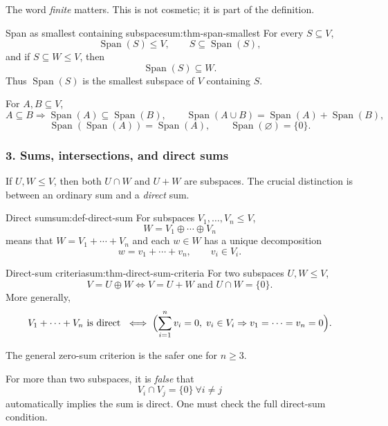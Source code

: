 The word \emph{finite} matters. This is not cosmetic; it is part of the definition.

\begin{theorem}{Span as smallest containing subspace}{sum:thm-span-smallest}
For every \(S\subseteq V\),
\[
\operatorname{Span}(S)\le V,\qquad
S\subseteq \operatorname{Span}(S),
\]
and if \(S\subseteq W\le V\), then
\[
\operatorname{Span}(S)\subseteq W.
\]
Thus \(\operatorname{Span}(S)\) is the smallest subspace of \(V\) containing \(S\).
\end{theorem}

\begin{keyformula}[title={Key Formula: basic span identities}]
For \(A,B\subseteq V\),
\[
A\subseteq B \Rightarrow \operatorname{Span}(A)\subseteq \operatorname{Span}(B),
\qquad
\operatorname{Span}(A\cup B)=\operatorname{Span}(A)+\operatorname{Span}(B),
\]
\[
\operatorname{Span}(\operatorname{Span}(A))=\operatorname{Span}(A),
\qquad
\operatorname{Span}(\varnothing)=\{0\}.
\]
\end{keyformula}

\subsubsection*{3. Sums, intersections, and direct sums}

If \(U,W\le V\), then both \(U\cap W\) and \(U+W\) are subspaces. The crucial distinction is between an ordinary sum and a \emph{direct} sum.

\begin{definition}{Direct sum}{sum:def-direct-sum}
For subspaces \(V_1,\dots,V_n\le V\),
\[
W=V_1\oplus\cdots\oplus V_n
\]
means that \(W=V_1+\cdots+V_n\) and each \(w\in W\) has a unique decomposition
\[
w=v_1+\cdots+v_n,\qquad v_i\in V_i.
\]
\end{definition}

\begin{theorem}{Direct-sum criteria}{sum:thm-direct-sum-criteria}
For two subspaces \(U,W\le V\),
\[
V=U\oplus W
\iff
V=U+W \text{ and } U\cap W=\{0\}.
\]
More generally,
\[
V_1+\cdots+V_n \text{ is direct }
\iff
\Bigl(\sum_{i=1}^n v_i = 0,\; v_i\in V_i \Rightarrow v_1=\cdots=v_n=0\Bigr).
\]
\end{theorem}

The general zero-sum criterion is the safer one for \(n\ge 3\).

\begin{commonmistake}[title={Common Mistake: pairwise trivial intersections are not enough for \(n\ge 3\)}]
For more than two subspaces, it is \emph{false} that
\[
V_i\cap V_j=\{0\}\ \forall i\neq j
\]
automatically implies the sum is direct. One must check the full direct-sum condition.
\end{commonmistake}

